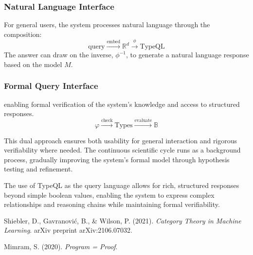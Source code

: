 \documentclass[11pt]{article}
\begin{document}
\subsubsection{Natural Language Interface}
For general users, the system processes natural language through the composition:
\[
\text{query} \xrightarrow{\text{embed}} \mathbb{R}^d \xrightarrow{\phi} \text{TypeQL}
\]
The answer can draw on the inverse, $\phi^{-1}$, to generate a natural language response based on the model $M$.

\subsubsection{Formal Query Interface}
enabling formal verification of the system's knowledge and access to structured responses.
\[
\varphi \xrightarrow{\text{check}} \text{Types} \xrightarrow{\text{evaluate}} \mathbb{B}
\]

This dual approach ensures both usability for general interaction and rigorous verifiability where needed. The continuous scientific cycle runs as a background process, gradually improving the system's formal model through hypothesis testing and refinement. 

The use of TypeQL as the query language allows for rich, structured responses beyond simple boolean values, enabling the system to express complex relationships and reasoning chains while maintaining formal verifiability.



\begin{thebibliography}{9}

Shiebler, D., Gavranović, B., \& Wilson, P. (2021).
\textit{Category Theory in Machine Learning}.
arXiv preprint arXiv:2106.07032.

Mimram, S. (2020).
\textit{Program = Proof}.
\end{thebibliography}
\end{document}
